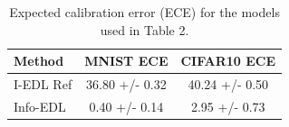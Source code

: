 \begin{table}[t]
\centering
\caption{Expected calibration error (ECE) for the models used in Table 2.}
\small
\begin{tabular}{lcc}
\toprule
Method & MNIST ECE & CIFAR10 ECE \\
\midrule
I-EDL Ref & 36.80 +/- 0.32 & 40.24 +/- 0.50 \\
Info-EDL & 0.40 +/- 0.14 & 2.95 +/- 0.73 \\
\bottomrule
\end{tabular}
\end{table}
